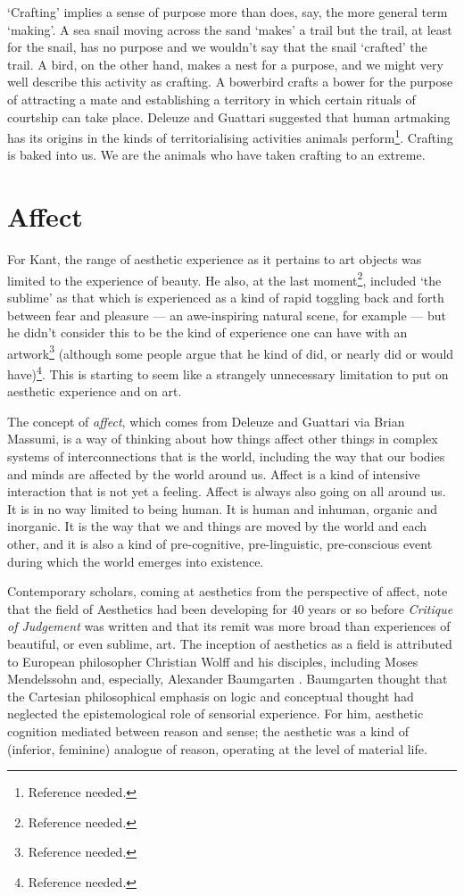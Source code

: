 \documentclass[letterpaper]{article}
\begin{document}
    ‘Crafting’ implies a sense of purpose more than does, say, the more general term ‘making’. A sea snail moving across the sand ‘makes’ a trail but the trail, at least for the snail, has no purpose and we wouldn't say that the snail ‘crafted’ the trail. A bird, on the other hand, makes a nest for a purpose, and we might very well describe this activity as crafting. A bowerbird crafts a bower for the purpose of attracting a mate and establishing a territory in which certain rituals of courtship can take place. Deleuze and Guattari suggested that human artmaking has its origins in the kinds of territorialising activities animals perform\footnote{Reference needed.}. Crafting is baked into us. We are the animals who have taken crafting to an extreme.

\section{Affect}

    For Kant, the range of aesthetic experience as it pertains to art objects was limited to the experience of beauty.  He also, at the last moment\footnote{Reference needed.}, included ‘the sublime’ as that which is experienced as a kind of rapid toggling back and forth between fear and pleasure — an awe-inspiring natural scene, for example — but he didn't consider this to be the kind of experience one can have with an artwork\footnote{Reference needed.} (although some people argue that he kind of did, or nearly did or would have)\footnote{Reference needed.}. This is starting to seem like a strangely unnecessary limitation to put on aesthetic experience and on art. 
        
    The concept of \emph{affect}, which comes from Deleuze and Guattari via Brian Massumi, is a way of thinking about how things affect other things in complex systems of interconnections that is the world, including the way that our bodies and minds are affected by the world around us. Affect is a kind of intensive interaction that is not yet a feeling. Affect is always also going on all around us. It is in no way limited to being human. It is human and inhuman, organic and inorganic. It is the way that we and things are moved by the world and each other, and it is also a kind of pre-cognitive, pre-linguistic, pre-conscious event during which the world emerges into existence. 
        
    Contemporary scholars, coming at aesthetics from the perspective of affect, note that the field of Aesthetics had been developing for 40 years or so before \emph{Critique of Judgement} was written and that its remit was more broad than experiences of beautiful, or even sublime, art. The inception of aesthetics as a field is attributed to European philosopher Christian Wolff and his disciples, including Moses Mendelssohn and, especially, Alexander Baumgarten \citep[pp.327-338]{EagletonFrPrtclrs1990}. Baumgarten thought that the Cartesian philosophical emphasis on logic and conceptual thought had neglected the epistemological role of sensorial experience. For him, aesthetic cognition mediated between reason and sense; the aesthetic was a kind of (inferior, feminine) analogue of reason, operating at the level of material life. 
        
\end{document}
